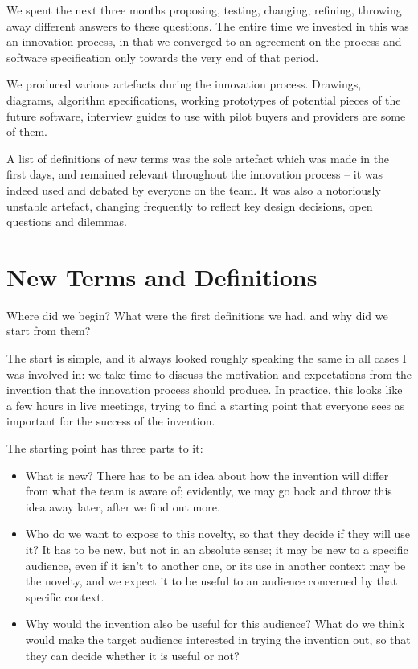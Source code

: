 \documentclass[graybox,envcountchap,sectrefs]{svmono}
\begin{document}
We spent the next three months proposing, testing, changing, refining, throwing away different answers to these questions. The entire time we invested in this was an innovation process, in that we converged to an agreement on the process and software specification only towards the very end of that period. 

We produced various artefacts during the innovation process. Drawings, diagrams, algorithm specifications, working prototypes of potential pieces of the future software, interview guides to use with pilot buyers and providers are some of them. 

A list of definitions of new terms was the sole artefact which was made in the first days, and remained relevant throughout the innovation process -- it was indeed used and debated by everyone on the team. It was also a notoriously unstable artefact, changing frequently to reflect key design decisions, open questions and dilemmas.

\section{New Terms and Definitions}
Where did we begin? What were the first definitions we had, and why did we start from them? 

The start is simple, and it always looked roughly speaking the same in all cases I was involved in: we take time to discuss the motivation and expectations from the invention that the innovation process should produce. In practice, this looks like a few hours in live meetings, trying to find a starting point that everyone sees as important for the success of the invention. 

The starting point has three parts to it:
\begin{itemize}
	\item What is new? There has to be an idea about how the invention will differ from what the team is aware of; evidently, we may go back and throw this idea away later, after we find out more.
	\item Who do we want to expose to this novelty, so that they decide if they will use it? It has to be new, but not in an absolute sense; it may be new to a specific audience, even if it isn't to another one, or its use in another context may be the novelty, and we expect it to be useful to an audience concerned by that specific context.
	\item Why would the invention also be useful for this audience? What do we think would make the target audience interested in trying the invention out, so that they can decide whether it is useful or not?
\end{itemize}
\end{document}
